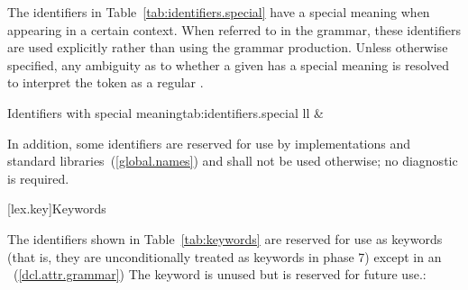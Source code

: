 \pnum
The identifiers in Table~\ref{tab:identifiers.special} have a special meaning when
appearing in a certain context. When referred to in the grammar, these identifiers
are used explicitly rather than using the  grammar production.
Unless otherwise specified, any ambiguity as to whether a given
 has a special meaning is resolved to interpret the
token as a regular .

\begin{floattable}{Identifiers with special meaning}{tab:identifiers.special}
{ll}
\topline
{}        &
           \\
\end{floattable}

\pnum
{}%
%
%
In addition, some identifiers are reserved for use by \Cpp
implementations and standard libraries~(\ref{global.names}) and shall
not be used otherwise; no diagnostic is required.%

[lex.key]{Keywords}

\enlargethispage{\baselineskip}%
\pnum
{}%
The identifiers shown in Table~\ref{tab:keywords} are reserved for use
as keywords (that is, they are unconditionally treated as keywords in
phase 7) except in an ~(\ref{dcl.attr.grammar})
\enternote The  keyword is unused but is reserved for future use.\exitnote:

